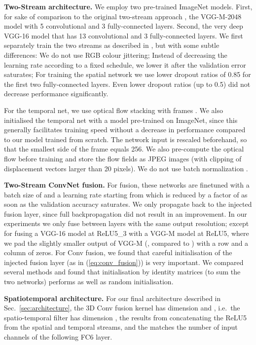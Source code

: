 \documentclass[10pt,twocolumn,letterpaper]{article}
\begin{document}
\textbf{Two-Stream architecture.} We employ two pre-trained ImageNet models. First, for sake of comparison to the original two-stream approach \cite{Simonyan14b}, the VGG-M-2048 model \cite{chatfield2014devil} with 5 convolutional and 3 fully-connected layers. Second, the very deep VGG-16 model \cite{simonyan2014very} that has 13 convolutional and 3 fully-connected layers. 
We first separately train the two streams as described in \cite{Simonyan14b}, but with some subtle differences: We do not use RGB colour jittering; Instead of decreasing the learning rate according to a fixed schedule, we lower it after the validation error saturates; For training the spatial network we use lower dropout ratios of 0.85 for the first two fully-connected layers. Even lower dropout ratios (up to 0.5) did not decrease performance significantly. 

For the temporal net, we use optical flow \cite{BroxECCV2004,Zach2007_OpticalFlow} stacking with  frames \cite{Simonyan14b}. We also initialised the temporal net with a model pre-trained on ImageNet, since this generally facilitates training speed without a decrease in performance compared to our model trained from scratch. The network input is rescaled beforehand, so that the smallest side of the frame equals 256. We also pre-compute the optical flow before training and store the flow fields as JPEG images (with clipping of displacement vectors larger than 20 pixels).  We do not use batch normalization \cite{ioffe2015batch}.


\textbf{Two-Stream ConvNet fusion.} For fusion, these networks are finetuned with a batch size of  and a learning rate starting from  which is reduced by a factor of  as soon as the validation accuracy saturates. We only propagate back to the injected fusion layer, since full backpropagation did not result in an improvement.
In our experiments we only fuse between layers with the same output resolution; except for fusing a VGG-16 model at ReLU5\_3 with a VGG-M model at ReLU5, where we pad the slightly smaller output of VGG-M (, compared to ) with a row and a column of zeros.
For Conv fusion, we found that careful initialisation of the injected fusion layer (as in (\ref{eq:conv_fusion})) is very important. We compared several methods and found that initialisation
by identity matrices (to sum the two networks) performs as well as random initialisation. 

\textbf{Spatiotemporal architecture.}
For our final architecture described in Sec.~\ref{sec:architecture},
the 3D Conv fusion kernel  has dimension  and , i.e.\ the spatio-temporal filter has dimension
, the  results
from concatenating the ReLU5 from the spatial and temporal streams,
and the  matches the number of input channels of the following FC6 layer. 
\end{document}
